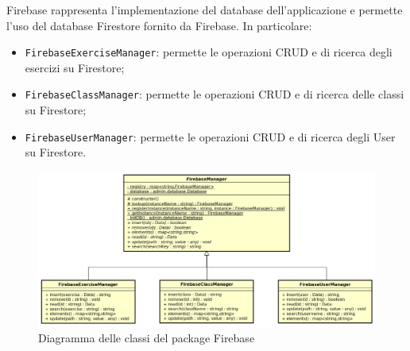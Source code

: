 Firebase rappresenta l'implementazione del database dell'applicazione e permette l'uso del database Firestore fornito da Firebase. In particolare:
\begin{itemize}
	\item \texttt{FirebaseExerciseManager}: permette le operazioni CRUD e di ricerca degli esercizi su Firestore;
	\item \texttt{FirebaseClassManager}: permette le operazioni CRUD e di ricerca delle classi su Firestore;
	\item \texttt{FirebaseUserManager}: permette le operazioni CRUD e di ricerca degli User su Firestore.
\end{itemize}

\begin{figure}[h]
	\includegraphics[scale=0.5]{images/FirebaseManager.png}
	\caption{Diagramma delle classi del package Firebase}
\end{figure}
